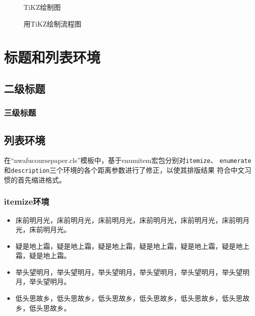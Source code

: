 \documentclass{nwafucoursepaper}
\begin{document}
\begin{figure}[!htp]
{\begin{subfloatrow}[2]
{
      }{\caption{TiKZ绘制图}\label{subfig:tikz}}
    \end{subfloatrow}
  }{\caption{用TiKZ绘制流程图}\label{fig:flowcharttikzdraw}}
\end{figure}

\section{标题和列表环境}
\subsection{二级标题}
\subsubsection{三级标题}
\zhlipsum[1]
\subsection{列表环境}
在\enquote{nwafucoursepaper.cls}模板中，基于enumitem宏包分别对\verb|itemize|、
\verb|enumerate|和\verb|description|三个环境的各个距离参数进行了修正，以使其排版结果
符合中文习惯的首先缩进格式。
\subsubsection{itemize环境}
\begin{itemize}
\item 床前明月光，床前明月光，床前明月光，床前明月光，床前明月光，床前明月光，床前明月光。
\item 疑是地上霜，疑是地上霜，疑是地上霜，疑是地上霜，疑是地上霜，疑是地上霜，疑是地上霜。
\item 举头望明月，举头望明月，举头望明月，举头望明月，举头望明月，举头望明月，举头望明月。
\item 低头思故乡，低头思故乡，低头思故乡，低头思故乡，低头思故乡，低头思故乡，低头思故乡。
\end{itemize}
\end{document}

